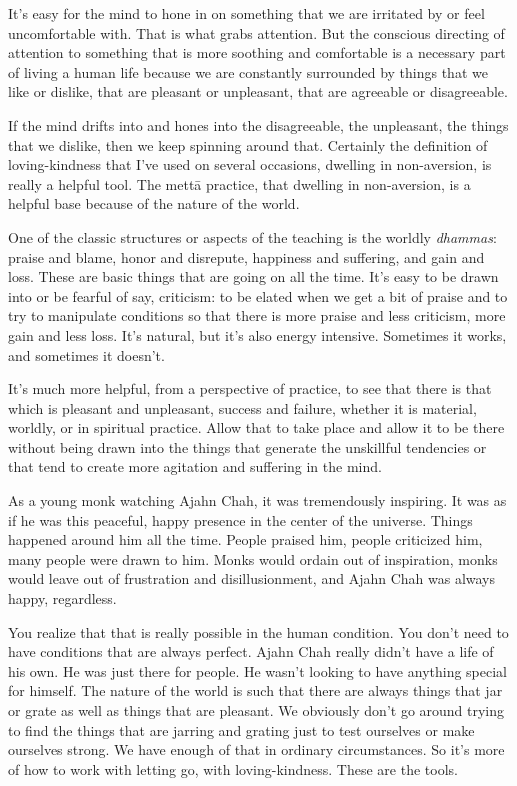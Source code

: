 It’s easy for the mind to hone in on something that we are irritated by
or feel uncomfortable with. That is what grabs attention. But the
conscious directing of attention to something that is more soothing and
comfortable is a necessary part of living a human life because we are
constantly surrounded by things that we like or dislike, that are
pleasant or unpleasant, that are agreeable or disagreeable.

If the mind drifts into and hones into the disagreeable, the unpleasant,
the things that we dislike, then we keep spinning around that. Certainly
the definition of loving-kindness that I’ve used on several occasions,
dwelling in non-aversion, is really a helpful tool. The mettā practice,
that dwelling in non-aversion, is a helpful base because of the nature
of the world.

One of the classic structures or aspects of the teaching is the worldly
\emph{dhammas}: praise and blame, honor and disrepute, happiness and
suffering, and gain and loss. These are basic things that are going on
all the time. It’s easy to be drawn into or be fearful of say,
criticism: to be elated when we get a bit of praise and to try to
manipulate conditions so that there is more praise and less criticism,
more gain and less loss. It’s natural, but it’s also energy intensive.
Sometimes it works, and sometimes it doesn’t.

It’s much more helpful, from a perspective of practice, to see that
there is that which is pleasant and unpleasant, success and failure,
whether it is material, worldly, or in spiritual practice. Allow that to
take place and allow it to be there without being drawn into the things
that generate the unskillful tendencies or that tend to create more
agitation and suffering in the mind.

As a young monk watching Ajahn Chah, it was tremendously inspiring. It
was as if he was this peaceful, happy presence in the center of the
universe. Things happened around him all the time. People praised him,
people criticized him, many people were drawn to him. Monks would ordain
out of inspiration, monks would leave out of frustration and
disillusionment, and Ajahn Chah was always happy, regardless.

You realize that that is really possible in the human condition. You
don’t need to have conditions that are always perfect. Ajahn Chah really
didn’t have a life of his own. He was just there for people. He wasn’t
looking to have anything special for himself. The nature of the world is
such that there are always things that jar or grate as well as things
that are pleasant. We obviously don’t go around trying to find the
things that are jarring and grating just to test ourselves or make
ourselves strong. We have enough of that in ordinary circumstances. So
it’s more of how to work with letting go, with loving-kindness. These
are the tools.

